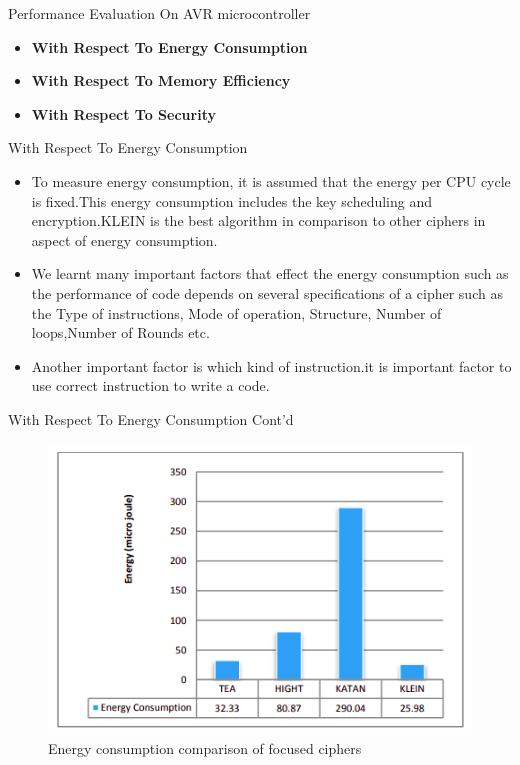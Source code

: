\begin{frame}{Performance Evaluation On AVR microcontroller}
	\begin{itemize}
		\item \textbf {With Respect To Energy Consumption}
		\item \textbf {With Respect To Memory Efficiency}
		\item \textbf {With Respect To Security}
	\end{itemize}
\end{frame}

\begin{frame}{With Respect To Energy Consumption}
	\begin{itemize}
		\item To measure energy consumption, it is assumed that the energy per CPU cycle is fixed.This energy consumption includes the key scheduling and encryption.KLEIN is the best algorithm in comparison to other ciphers in aspect of energy consumption.
		\item We learnt many important factors that effect the energy consumption such as the performance of code depends on several specifications of a cipher such as the Type of instructions, Mode of operation, Structure, Number of loops,Number of Rounds etc.
		\item Another important factor is which kind of instruction.it is important factor to use correct instruction to write a code.
	\end{itemize}
\end{frame}

\begin{frame}{With Respect To Energy Consumption Cont'd}
	\begin{itemize}
    \begin{figure}
    \centering
    \includegraphics[width= 75 mm]{images/EC.png} 
    \caption{Energy consumption comparison of focused ciphers}
    \label{fig:6distinguisher}
\end{figure} 
	\end{itemize}
\end{frame}

